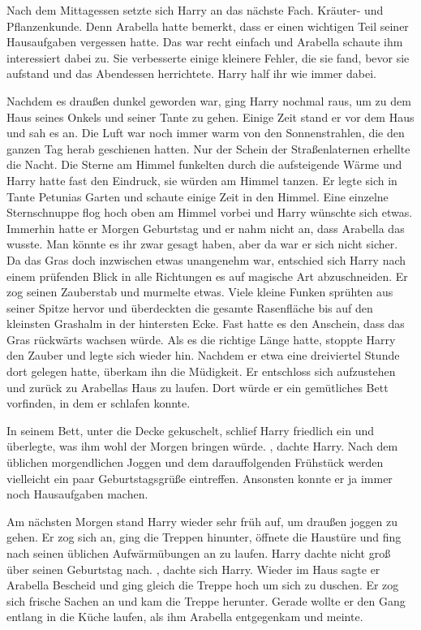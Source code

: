 Nach dem Mittagessen setzte sich Harry an das nächste Fach. Kräuter- und Pflanzenkunde. Denn Arabella hatte bemerkt, dass er einen wichtigen Teil seiner Hausaufgaben vergessen hatte. Das war recht einfach und Arabella schaute ihm interessiert dabei zu. Sie verbesserte einige kleinere Fehler, die sie fand, bevor sie aufstand und das Abendessen herrichtete. Harry half ihr wie immer dabei. 

Nachdem es draußen dunkel geworden war, ging Harry nochmal raus, um zu dem Haus seines Onkels und seiner Tante zu gehen. Einige Zeit stand er vor dem Haus und sah es an. Die Luft war noch immer warm von den Sonnenstrahlen, die den ganzen Tag herab geschienen hatten. Nur der Schein der Straßenlaternen erhellte die Nacht. Die Sterne am Himmel funkelten durch die aufsteigende Wärme und Harry hatte fast den Eindruck, sie würden am Himmel tanzen. Er legte sich in Tante Petunias Garten und schaute einige Zeit in den Himmel. Eine einzelne Sternschnuppe flog hoch oben am Himmel vorbei und Harry wünschte sich etwas. Immerhin hatte er Morgen Geburtstag und er nahm nicht an, dass Arabella das wusste. Man könnte es ihr zwar gesagt haben, aber da war er sich nicht sicher. Da das Gras doch inzwischen etwas unangenehm war, entschied sich Harry nach einem prüfenden Blick in alle Richtungen es auf magische Art abzuschneiden. Er zog seinen Zauberstab und murmelte etwas. Viele kleine Funken sprühten aus seiner Spitze hervor und überdeckten die gesamte Rasenfläche bis auf den kleinsten Grashalm in der hintersten Ecke. Fast hatte es den Anschein, dass das Gras rückwärts wachsen würde. Als es die richtige Länge hatte, stoppte Harry den Zauber und legte sich wieder hin. Nachdem er etwa eine dreiviertel Stunde dort gelegen hatte, überkam ihn die Müdigkeit. Er entschloss sich aufzustehen und zurück zu Arabellas Haus zu laufen. Dort würde er ein gemütliches Bett vorfinden, in dem er schlafen konnte.

In seinem Bett, unter die Decke gekuschelt, schlief Harry friedlich ein und überlegte, was ihm wohl der Morgen bringen würde. , dachte Harry. Nach dem üblichen morgendlichen Joggen und dem darauffolgenden Frühstück werden vielleicht ein paar Geburtstagsgrüße eintreffen. Ansonsten konnte er ja immer noch Hausaufgaben machen.

Am nächsten Morgen stand Harry wieder sehr früh auf, um draußen joggen zu gehen. Er zog sich an, ging die Treppen hinunter, öffnete die Haustüre und fing nach seinen üblichen Aufwärmübungen an zu laufen. Harry dachte nicht groß über seinen Geburtstag nach. , dachte sich Harry.  Wieder im Haus sagte er Arabella Bescheid und ging gleich die Treppe hoch um sich zu duschen. Er zog sich frische Sachen an und kam die Treppe herunter. Gerade wollte er den Gang entlang in die Küche laufen, als ihm Arabella entgegenkam und meinte.

